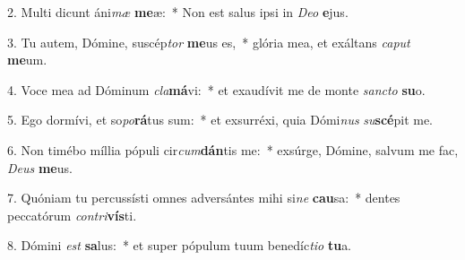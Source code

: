 2. Multi dicunt áni\textit{mæ} \textbf{me}æ:~*  Non est salus ipsi in \textit{De}\textit{o} \textbf{e}jus.\

3. Tu autem, Dómine, suscép\textit{tor} \textbf{me}us es,~*  glória mea, et exáltans \textit{ca}\textit{put} \textbf{me}um.\

4. Voce mea ad Dóminum \textit{cla}\textbf{má}vi:~*  et exaudívit me de monte \textit{sanc}\textit{to} \textbf{su}o.\

5. Ego dormívi, et so\textit{po}\textbf{rá}tus sum:~*  et exsurréxi, quia Dómi\textit{nus} \textit{su}\textbf{scé}pit me.\

6. Non timébo míllia pópuli cir\textit{cum}\textbf{dán}tis me:~*  exsúrge, Dómine, salvum me fac, \textit{De}\textit{us} \textbf{me}us.\

7. Quóniam tu percussísti omnes adversántes mihi si\textit{ne} \textbf{cau}sa:~*  dentes peccatórum \textit{con}\textit{tri}\textbf{vís}ti.\

8. Dómini \textit{est} \textbf{sa}lus:~*  et super pópulum tuum benedíc\textit{ti}\textit{o} \textbf{tu}a.\

